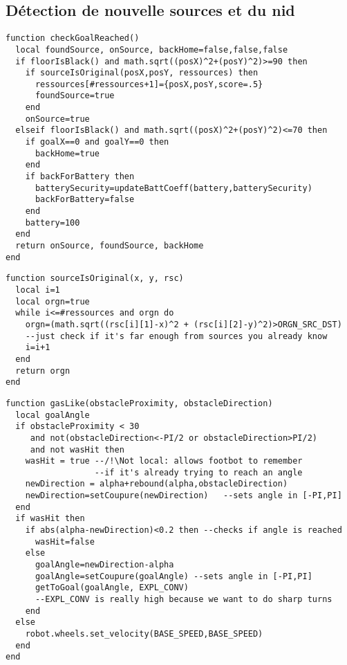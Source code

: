 \begin{subappendices}
\subsection{Détection de nouvelle sources et du nid}

\begin{lstlisting}[caption=fonction checkGoalReached]
function checkGoalReached()
  local foundSource, onSource, backHome=false,false,false
  if floorIsBlack() and math.sqrt((posX)^2+(posY)^2)>=90 then
    if sourceIsOriginal(posX,posY, ressources) then
      ressources[#ressources+1]={posX,posY,score=.5}
      foundSource=true
    end
    onSource=true
  elseif floorIsBlack() and math.sqrt((posX)^2+(posY)^2)<=70 then
    if goalX==0 and goalY==0 then
      backHome=true
    end
    if backForBattery then
      batterySecurity=updateBattCoeff(battery,batterySecurity)
      backForBattery=false
    end
    battery=100
  end
  return onSource, foundSource, backHome
end
\end{lstlisting}

\begin{lstlisting}[caption=Vérifier l'originalité de la source]
function sourceIsOriginal(x, y, rsc)
  local i=1
  local orgn=true
  while i<=#ressources and orgn do
    orgn=(math.sqrt((rsc[i][1]-x)^2 + (rsc[i][2]-y)^2)>ORGN_SRC_DST)
    --just check if it's far enough from sources you already know
    i=i+1
  end
  return orgn
end
\end{lstlisting}


\begin{lstlisting}[caption=Déplacement \emph{gaslike}]
function gasLike(obstacleProximity, obstacleDirection)
  local goalAngle
  if obstacleProximity < 30
     and not(obstacleDirection<-PI/2 or obstacleDirection>PI/2)
     and not wasHit then
    wasHit = true --/!\Not local: allows footbot to remember
                  --if it's already trying to reach an angle
    newDirection = alpha+rebound(alpha,obstacleDirection)
    newDirection=setCoupure(newDirection)   --sets angle in [-PI,PI]
  end
  if wasHit then
    if abs(alpha-newDirection)<0.2 then --checks if angle is reached
      wasHit=false
    else
      goalAngle=newDirection-alpha
      goalAngle=setCoupure(goalAngle) --sets angle in [-PI,PI]
      getToGoal(goalAngle, EXPL_CONV)
      --EXPL_CONV is really high because we want to do sharp turns
    end
  else
    robot.wheels.set_velocity(BASE_SPEED,BASE_SPEED)
  end
end


\end{lstlisting}
\end{subappendices}
